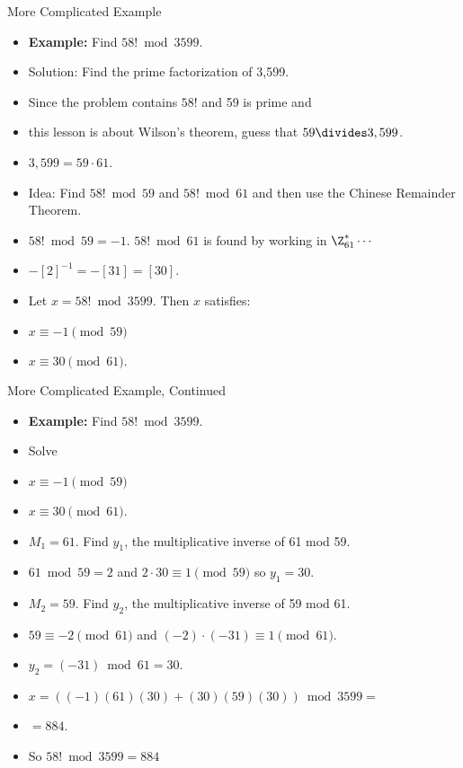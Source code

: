 \documentclass{beamer}
\begin{document}
\begin{frame}{More Complicated Example}
\begin{itemize}
  \item \textbf{Example:} Find $58! \bmod 3599$.
  \item Solution: Find the prime factorization of 3,599.
  \item Since the problem contains $58!$ and 59 is prime and
  \item this lesson is about Wilson's theorem, guess that $59\divides 3,599$.
  \item $3,599 = 59 \cdot 61$.
  \item Idea: Find $58! \bmod 59$ and $58! \bmod 61$ and then use the Chinese Remainder Theorem.
  \item $58! \bmod 59 = -1$. $58!\bmod 61$ is found by working in $\Z_{61}^* \cdots$
  \item $-[2]^{-1}=-[31]=[30]$.
  \item Let $x=58! \bmod 3599$. Then $x$ satisfies:
  \item $x \equiv -1 \pmod {59}$
  \item $x \equiv 30 \pmod {61}$.
\end{itemize}
\end{frame}

\begin{frame}{More Complicated Example, Continued}
\begin{itemize}
  \item \textbf{Example:} Find $58! \bmod 3599$.
  \item Solve
  \item $x \equiv -1 \pmod {59}$
  \item $x \equiv 30 \pmod {61}$.
  \item $M_1 = 61$. Find $y_1$, the multiplicative inverse of 61 mod 59.
  \item $61 \bmod 59 = 2$ and $2\cdot 30 \equiv 1 \pmod {59}$ so $y_1=30$.
  \item $M_2 = 59$. Find $y_2$, the multiplicative inverse of 59 mod 61.
  \item $59 \equiv -2 \pmod{61}$ and $(-2)\cdot(-31) \equiv 1 \pmod {61}$.
  \item $y_2 = (-31) \bmod 61 = 30$.
  \item $x = \left( (-1)(61)(30) + (30)(59)(30) \right) \bmod 3599=$
  \item $=884$.
  \item So $58! \bmod 3599 = 884$
\end{itemize}
\end{frame}
\end{document}
